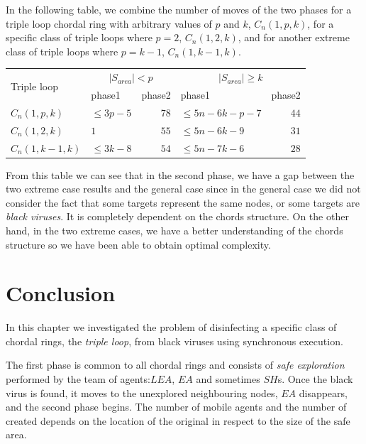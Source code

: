 In the following table, we combine the number of moves of the two phases for a triple loop chordal ring with arbitrary values of $p$ and $k$, $C_n(1,p,k)$, for a specific class of triple loops where $p=2$, $C_n(1,2,k)$, and for another extreme class of triple loops where $p=k-1$, $C_n(1,k-1,k)$.


\begin{center}
\begin{tabular}{|l|lr|lr|}\hline
\multirow {2}{1 in}{Triple loop} &
\multicolumn{2}{c|}{$|S_{area}|<p$} &
\multicolumn{2}{c|}{$|S_{area}|\ge k$}\\
 & phase1 & phase2 & phase1 & phase2   \\\hline\hline
$C_n(1,p,k)$  &$\leq 3p-5$     & $78$ & $\leq 5n-6k-p-7$    &  $44$  \\\hline
$C_n(1,2,k)$   &$1$ & $55$   & $\leq 5n-6k-9$ & $31$                 \\\hline
$C_n(1,k-1,k)$ &$\leq 3k-8$ & $54$   & $ \leq 5n-7k-6$   & $28$                          \\\hline
\end{tabular}
\end{center}



From this table we can see that in the second phase, we have a gap between the two extreme case results and the general case since in the general case we did not consider the fact that some targets represent the same nodes, or some targets are {\it black viruses}. It is completely dependent on the chords structure. On the other hand, in the two extreme cases, we have a better understanding of the chords structure so we have been able to obtain optimal complexity.

 



\section {Conclusion}


In this chapter we investigated the problem of disinfecting a specific class of chordal rings, the {\it triple loop}, from  black viruses using synchronous execution.


The first phase is common to all chordal rings and consists of {\it safe exploration} performed  by the team of agents:$LEA$, $EA$ and sometimes $SH$s. 
Once the black virus is found, it moves to the unexplored neighbouring nodes, $EA$ disappears, and the second phase begins. The number of mobile agents and the number of \bvs created depends on the location of the original \bv in respect to the size of the safe area.

